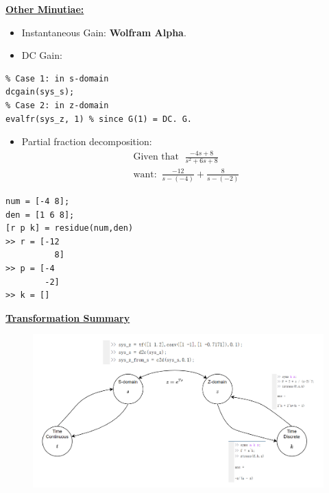 \textbf{\underline{Other Minutiae:}}
\begin{itemize}
    \item Instantaneous Gain: \textbf{Wolfram Alpha}.
    \item DC Gain:
\end{itemize}
\begin{lstlisting}
% Case 1: in s-domain
dcgain(sys_s);
% Case 2: in z-domain
evalfr(sys_z, 1) % since G(1) = DC. G.
\end{lstlisting}

\begin{itemize}
    \item Partial fraction decomposition:
    \begin{align*}
        \text{Given that }\; \frac{-4s+8}{s^2+6s+8} \\
        \text{want: }\, \frac{-12}{s-(-4)} + \frac{8}{s-(-2)}
    \end{align*}
\end{itemize}
\begin{lstlisting}
num = [-4 8];
den = [1 6 8];
[r p k] = residue(num,den)
>> r = [-12 
          8]
>> p = [-4 
        -2]
>> k = []        
\end{lstlisting}


\textbf{\underline{Transformation Summary}}
\begin{figure}[h]
    \centering
    \includegraphics[width=1.0\linewidth]{images/transformation_Summary.png}
\end{figure}